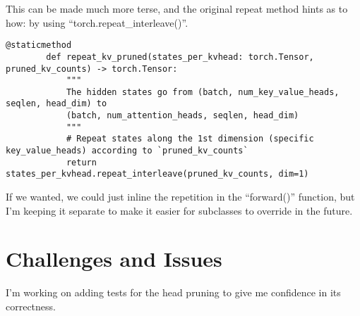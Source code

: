 \documentclass{article}
\begin{document}
    This can be made much more terse, and the original repeat method hints as to how: by using ``torch.repeat\_interleave()''.

    \begin{lstlisting}[label={lst:updated}]
    @staticmethod
        def repeat_kv_pruned(states_per_kvhead: torch.Tensor, pruned_kv_counts) -> torch.Tensor:
            """
            The hidden states go from (batch, num_key_value_heads, seqlen, head_dim) to
            (batch, num_attention_heads, seqlen, head_dim)
            """
            # Repeat states along the 1st dimension (specific key_value_heads) according to `pruned_kv_counts`
            return states_per_kvhead.repeat_interleave(pruned_kv_counts, dim=1)
    \end{lstlisting}

    If we wanted, we could just inline the repetition in the ``forward()'' function, but I'm keeping it separate to make it easier for subclasses to override in the future.

    \section{Challenges and Issues}\label{sec:challenges-and-issues}

    I'm working on adding tests for the head pruning to give me confidence in its correctness.
\end{document}
